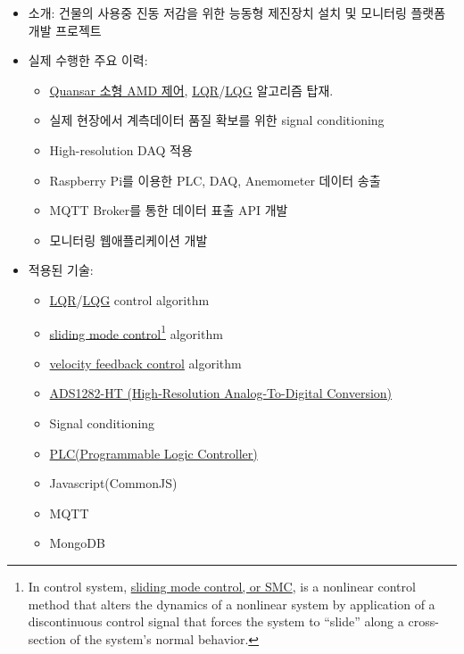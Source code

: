 \documentclass[10pt,a4paper,ragged2e]{altacv}
\begin{document}
\begin{fullwidth}
\begin{itemize}
\item 소개: 건물의 사용중 진동 저감을 위한 능동형 제진장치 설치 및 모니터링 플랫폼 개발 프로젝트
\item 실제 수행한 주요 이력:
  \begin{itemize}
    \item \href{http://www.quanser.com/products/active_mass_damper}{Quansar 소형 AMD 제어}, \href{https://en.wikipedia.org/wiki/Linear-quadratic_regulator}{LQR}/\href{https://en.wikipedia.org/wiki/Linear-quadratic-Gaussian_control}{LQG} 알고리즘 탑재.
    \item 실제 현장에서 계측데이터 품질 확보를 위한 signal conditioning
    \item High-resolution DAQ 적용
    \item Raspberry Pi를 이용한 PLC, DAQ, Anemometer 데이터 송출
    \item MQTT Broker를 통한 데이터 표출 API 개발
    \item 모니터링 웹애플리케이션 개발
  \end{itemize}
\item
 적용된 기술:
   \begin{itemize}
    \item \href{https://en.wikipedia.org/wiki/Linear-quadratic_regulator}{LQR}/\href{https://en.wikipedia.org/wiki/Linear-quadratic-Gaussian_control}{LQG} control algorithm
    \item \href{https://en.wikipedia.org/wiki/Sliding_mode_control}{sliding mode control}\footnote{In control system,  \href{https://en.wikipedia.org/wiki/Sliding_mode_control}{sliding mode control, or SMC}, is a nonlinear control method that alters the dynamics of a nonlinear system by application of a discontinuous control signal that forces the system to ``slide'' along a cross-section of the system's normal behavior.} algorithm 
    \item \href{https://en.wikipedia.org/wiki/Minor_loop_feedback}{velocity feedback control} algorithm
    \item \href{http://www.ti.com/lit/ds/symlink/ads1282-ht.pdf}{ADS1282-HT (High-Resolution Analog-To-Digital Conversion)}
    \item Signal conditioning
    \item \href{https://en.wikipedia.org/wiki/Programmable_logic_controller}{PLC(Programmable Logic Controller)}
    \item Javascript(CommonJS)
    \item MQTT
    \item MongoDB

\end{itemize}
\end{itemize}
\end{fullwidth}
\end{document}
